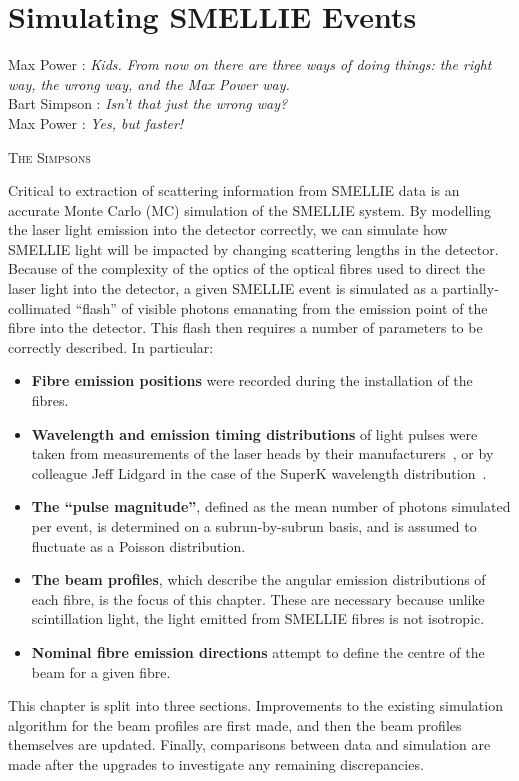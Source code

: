 \chapter{Simulating SMELLIE Events}\label{sect:beam_profiling}
\setlength{\epigraphwidth}{.5\textwidth}
\epigraph{Max Power : \textit{Kids. From now on there are three ways of doing things: the right way, the wrong way, and the Max Power way.}\\
Bart Simpson : \textit{Isn't that just the wrong way?}\\
Max Power : \textit{Yes, but faster!}}{\textsc{The Simpsons}}
\setlength{\epigraphwidth}{.4\textwidth}
Critical to extraction of scattering information from SMELLIE data is an accurate Monte Carlo (MC) simulation of the SMELLIE system. By modelling the laser light emission into the detector correctly, we can simulate how SMELLIE light will be impacted by changing scattering lengths in the detector. Because of the complexity of the optics of the optical fibres used to direct the laser light into the detector, a given SMELLIE event is simulated as a partially-collimated ``flash'' of visible photons emanating from the emission point of the fibre into the detector. This flash then requires a number of parameters to be correctly described. In particular:
\begin{itemize}
    \item \textbf{Fibre emission positions} were recorded during the installation of the fibres.
    \item \textbf{Wavelength and emission timing distributions} of light pulses were taken from measurements of the laser heads by their manufacturers~\cite{}, or by colleague Jeff Lidgard in the case of the SuperK wavelength distribution~\cite{}.
    \item \textbf{The ``pulse magnitude''}, defined as the mean number of photons simulated per event, is determined on a subrun-by-subrun basis, and is assumed to fluctuate as a Poisson distribution. 
    \item \textbf{The beam profiles}, which describe the angular emission distributions of each fibre, is the focus of this chapter. These are necessary because unlike scintillation light, the light emitted from SMELLIE fibres is not isotropic.
    \item \textbf{Nominal fibre emission directions} attempt to define the centre of the beam for a given fibre.
\end{itemize}

This chapter is split into three sections. Improvements to the existing simulation algorithm for the beam profiles are first made, and then the beam profiles themselves are updated. Finally, comparisons between data and simulation are made after the upgrades to investigate any remaining discrepancies.


